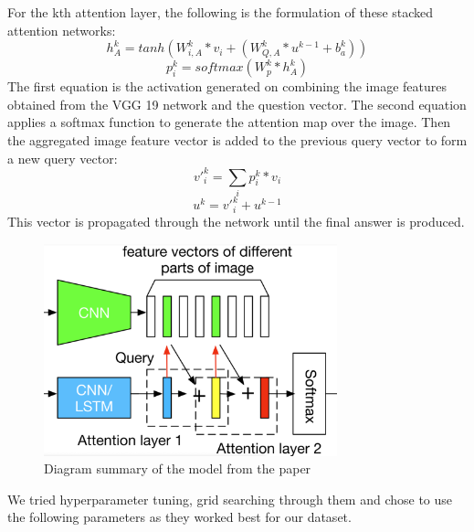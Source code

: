\documentclass[journal, a4paper]{IEEEtran}
\begin{document}
For the kth attention layer, the following is the formulation of these stacked attention networks:
\begin{equation}
h_A^k = tanh (W_{i,A}^k*v_i + (W_{Q,A}^k*u^{k-1} + b_a^k))
\end{equation}
\begin{equation}
p_i^k = softmax(W_{p}^k*h_A^k)
\end{equation}
The first equation is the activation generated on combining the image features obtained from the VGG 19 network and the question vector. The second equation applies a softmax function to generate the attention map over the image.
Then the aggregated image
feature vector is added to the previous query vector to form a new query vector:
\begin{equation}
{v'}_i^k = {\sum\limits_i}p_i^k * v_i
\end{equation}
\begin{equation}
{u}^k = {v'}_i^k + u^{k-1}
\end{equation}
This vector is propagated through the network until the final answer is produced. 
\vspace{-5mm}
\begin{figure}[ht]
    \caption{Diagram summary of the model from the paper}
\centering
 \includegraphics[scale = 0.55, width=8.5cm]{diagram_network.png}
\end{figure}
\vspace{-5mm}
We tried hyperparameter tuning, grid searching through them and chose to use the following parameters as they worked best for our dataset.
\end{document}
